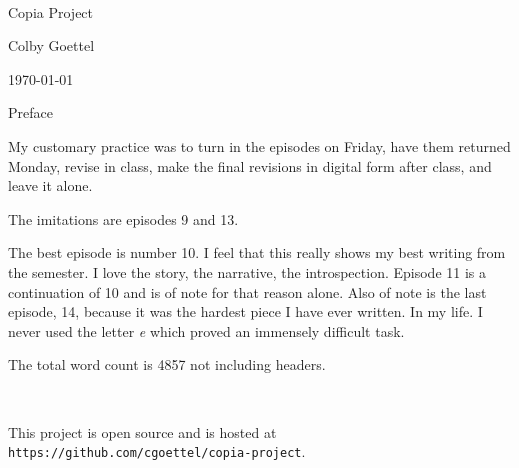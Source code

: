 \documentclass[11pt]{article}
\begin{document}
\begin{titlepage}
    \begin{center}
        ~
        
        \vspace{5em}
        
        {\Huge Copia Project}
        
        \vfill
        
        {\Large Colby Goettel}
        
        \vspace{1.5em}
        
        \today
    \end{center}
\end{titlepage}

\begin{center}
    {\large Preface}
\end{center}

\thispagestyle{empty}My customary practice was to turn in the episodes on Friday, have them returned Monday, revise in class, make the final revisions in digital form after class, and leave it alone.

The imitations are episodes 9 and 13.

The best episode is number 10. I feel that this really shows my best writing from the semester. I love the story, the narrative, the introspection. Episode 11 is a continuation of 10 and is of note for that reason alone. Also of note is the last episode, 14, because it was the hardest piece I have ever written. In my life. I never used the letter \textit{e} which proved an immensely difficult task.

The total word count is 4857 not including headers.

~

This project is open source and is hosted at \texttt{https://github.com/cgoettel/copia-project}.
\end{document}
